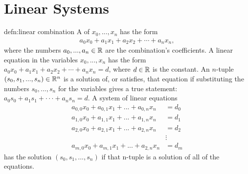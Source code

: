 \section{Linear Systems}

\begin{defn}{defn:linear combination}
	A  of $x_0,..., x_n$ has the form 
	\begin{align*}
	a_0x_0 + a_1x_1 + a_2x_2 + \cdots + a_nx_n,
	\end{align*}
	where the numbers $a_0,..., a_n \in {\mathbb R}$ are the combination’s coefficients. A linear
	equation in the variables $x_0,..., x_n$ has the form $a_0x_0 + a_1x_1 + a_2x_2 + \cdots +
	a_nx_n = d$, where $d \in{\mathbb R}$ is the constant. An $n$-tuple $(s_0, s_1,..., s_n) \in{\mathbb R}^n$ is a solution of, or satisfies, that equation
	if substituting the numbers $s_0,..., s_n$ for the variables gives a true statement: $a_0s_0 + a_1s_1 + · · · + a_ns_n = d$. A system of linear equations
	\begin{align*}
	a_{0,0}x_0 + a_{0,1}x_1 + ... + a_{0,n}x_n &= d_0 \\
	a_{1,0}x_0 + a_{1,1}x_1 + ... + a_{1,n}x_n &= d_1 \\
	a_{2,0}x_0 + a_{2,1}x_1 + ... + a_{2,n}x_n &= d_2 \\
	&\vdots \\
	a_{m,0}x_0 + a_{m,1}x_1 + ... + a_{2,n}x_n &= d_m
	\end{align*}
	has the solution $(s_0, s_1,..., s_n)$ if that n-tuple is a solution of all of the equations.
\end{defn}

